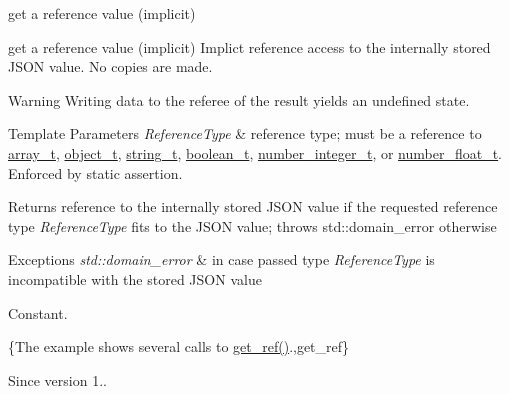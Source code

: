 get a reference value (implicit) 

get a reference value (implicit) Implict reference access to the internally stored J\+S\+ON value. No copies are made.

\begin{DoxyWarning}{Warning}
Writing data to the referee of the result yields an undefined state.
\end{DoxyWarning}

\begin{DoxyTemplParams}{Template Parameters}
{\em Reference\+Type} & reference type; must be a reference to \hyperlink{classnlohmann_1_1basic__json_ab00b882d39306d663c23dab110f5cae0}{array\+\_\+t}, \hyperlink{classnlohmann_1_1basic__json_a0ac9894c9de8dc551cf2e5f1c605537f}{object\+\_\+t}, \hyperlink{classnlohmann_1_1basic__json_ab63e618bbb0371042b1bec17f5891f42}{string\+\_\+t}, \hyperlink{classnlohmann_1_1basic__json_af3bc3e83aa162d7ba4df16a949872723}{boolean\+\_\+t}, \hyperlink{classnlohmann_1_1basic__json_ac4b10b2364f26ce47bdb9a413ff04a59}{number\+\_\+integer\+\_\+t}, or \hyperlink{classnlohmann_1_1basic__json_a74a0013e847fdc574b48f931f0e757e1}{number\+\_\+float\+\_\+t}. Enforced by static assertion.\\
\hline
\end{DoxyTemplParams}
\begin{DoxyReturn}{Returns}
reference to the internally stored J\+S\+ON value if the requested reference type {\itshape Reference\+Type} fits to the J\+S\+ON value; throws std\+::domain\+\_\+error otherwise
\end{DoxyReturn}

\begin{DoxyExceptions}{Exceptions}
{\em std\+::domain\+\_\+error} & in case passed type {\itshape Reference\+Type} is incompatible with the stored J\+S\+ON value\\
\hline
\end{DoxyExceptions}
Constant.

\{The example shows several calls to {\ttfamily \hyperlink{classnlohmann_1_1basic__json_a4f332e90f3cae562d0c3fa6ba48f74f9}{get\+\_\+ref()}}.,get\+\_\+ref\}

\begin{DoxySince}{Since}
version 1.. 
\end{DoxySince}
\hypertarget{classnlohmann_1_1basic__json_a683cd53457a2a74dc82561e085381d8e}{}\label{classnlohmann_1_1basic__json_a683cd53457a2a74dc82561e085381d8e} 
